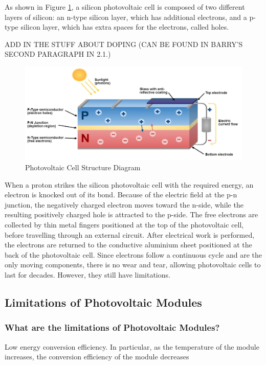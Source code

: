 \noindent As shown in Figure \ref{fig:photovoltaic_cell_diagram}, a silicon photovoltaic cell is composed of two different layers of silicon: an n-type silicon layer, which has additional electrons, and a p-type silicon layer, which has extra spaces for the electrons, called holes.\par

ADD IN THE STUFF ABOUT DOPING (CAN BE FOUND IN BARRY'S SECOND PARAGRAPH IN 2.1.)

\begin{figure}[h]
    \centering
    \includegraphics[width=1\textwidth]{Figures/photovoltaic_cell_diagram.jpg}
    \caption{Photovoltaic Cell Structure Diagram}
    \label{fig:photovoltaic_cell_diagram}
\end{figure}
\FloatBarrier

\noindent When a proton strikes the silicon photovoltaic cell with the required energy, an electron is knocked out of its bond. Because of the electric field at the p-n junction, the negatively charged electron moves toward the n-side, while the resulting positively charged hole is attracted to the p-side. The free electrons are collected by thin metal fingers positioned at the top of the photovoltaic cell, before travelling through an external circuit. After electrical work is performed, the electrons are returned to the conductive aluminium sheet positioned at the back of the photovoltaic cell. Since electrons follow a continuous cycle and are the only moving components, there is no wear and tear, allowing photovoltaic cells to last for decades. However, they still have limitations.\vspace{0.5em}

\subsection{Limitations of Photovoltaic Modules}
\subsubsection{What are the limitations of Photovoltaic Modules?}
Low energy conversion efficiency. In particular, as the temperature of the module increases, the conversion efficiency of the module decreases\par

